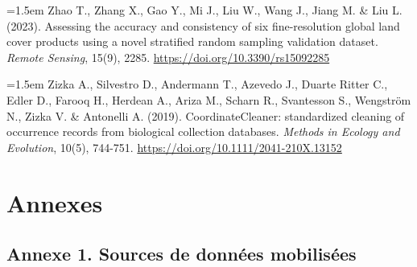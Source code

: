 \documentclass[a4paper,12pt]{report}
\begin{document}
\noindent\hangindent=1.5em Zhao T., Zhang X., Gao Y., Mi J., Liu W., Wang J., Jiang M. \& Liu L. (2023). Assessing the accuracy and consistency of six fine-resolution global land cover products using a novel stratified random sampling validation dataset. \textit{Remote Sensing}, 15(9), 2285. \url{https://doi.org/10.3390/rs15092285}\par\medskip
\noindent\hangindent=1.5em Zizka A., Silvestro D., Andermann T., Azevedo J., Duarte Ritter C., Edler D., Farooq H., Herdean A., Ariza M., Scharn R., Svantesson S., Wengström N., Zizka V. \& Antonelli A. (2019). CoordinateCleaner: standardized cleaning of occurrence records from biological collection databases. \textit{Methods in Ecology and Evolution}, 10(5), 744-751. \url{https://doi.org/10.1111/2041-210X.13152}\par\medskip

\chapter*{Annexes}
{}

\section*{Annexe 1. Sources de données mobilisées}
{}
\end{document}
